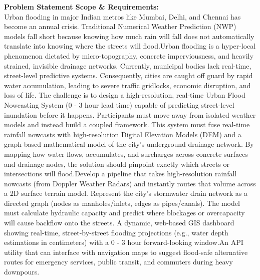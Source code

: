 \documentclass[10pt,a4paper]{article}
\begin{document}
\begin{tcolorbox}[pscard, title={"\textbf{SIH26085} \quad $\vert$ \quad Urban Flood Nowcasting System (Drainage and Rainfall Coupling)}]
\textbf{\color{sihnavy}Problem Statement Scope \& Requirements:}\\[0.15cm]
\noindent\small Urban flooding in major Indian metros like Mumbai, Delhi, and Chennai has become an annual crisis. Traditional Numerical Weather Prediction (NWP) models fall short because knowing how much rain will fall does not automatically translate into knowing where the streets will flood.Urban flooding is a hyper-local phenomenon dictated by micro-topography, concrete imperviousness, and heavily strained, invisible drainage networks. Currently, municipal bodies lack real-time, street-level predictive systems. Consequently, cities are caught off guard by rapid water accumulation, leading to severe traffic gridlocks, economic disruption, and loss of life. The challenge is to design a high-resolution, real-time Urban Flood Nowcasting System (0 - 3 hour lead time) capable of predicting street-level inundation before it happens. Participants must move away from isolated weather models and instead build a coupled framework. This system must fuse real-time rainfall nowcasts with high-resolution Digital Elevation Models (DEM) and a graph-based mathematical model of the city's underground drainage network. By mapping how water flows, accumulates, and surcharges across concrete surfaces and drainage nodes, the solution should pinpoint exactly which streets or intersections will flood.Develop a pipeline that takes high-resolution rainfall nowcasts (from Doppler Weather Radars) and instantly routes that volume across a 2D surface terrain model. Represent the city's stormwater drain network as a directed graph (nodes as manholes/inlets, edges as pipes/canals). The model must calculate hydraulic capacity and predict where blockages or overcapacity will cause backflow onto the streets. A dynamic, web-based GIS dashboard showing real-time, street-by-street flooding projections (e.g., water depth estimations in centimeters) with a 0 - 3 hour forward-looking window.An API utility that can interface with navigation maps to suggest flood-safe alternative routes for emergency services, public transit, and commuters during heavy downpours.\par\vspace{0.06cm}

\end{tcolorbox}
\vspace{0.4cm}
{}
\end{document}

